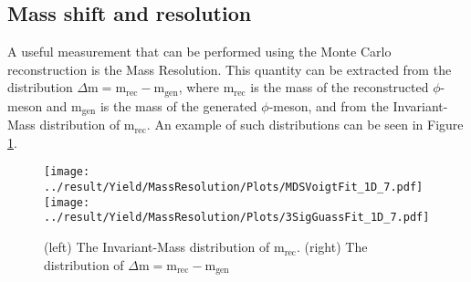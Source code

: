 \subsection{Mass shift and resolution}
A useful measurement that can be performed using the Monte Carlo reconstruction is the Mass Resolution. This quantity can be extracted from the distribution $\Delta\text{m} = \text{m}_{\text{rec}} - \text{m}_{\text{gen}}$, where $\text{m}_{\text{rec}}$ is the mass of the reconstructed $\phi$-meson and $\text{m}_{\text{gen}}$ is the mass of the generated $\phi$-meson, and from the Invariant-Mass distribution of $\text{m}_{\text{rec}}$. An example of such distributions can be seen in Figure \ref{fig:InvMassDist}.

\begin{figure}[!h]
\centering
\texttt{[image: ../result/Yield/MassResolution/Plots/MDSVoigtFit\_1D\_7.pdf]}
\texttt{[image: ../result/Yield/MassResolution/Plots/3SigGuassFit\_1D\_7.pdf]}
\caption{(left) The Invariant-Mass distribution of $\text{m}_{\text{rec}}$. (right) The distribution of $\Delta\text{m} = \text{m}_{\text{rec}} - \text{m}_{\text{gen}}$ }
\label{fig:InvMassDist}
\end{figure}

